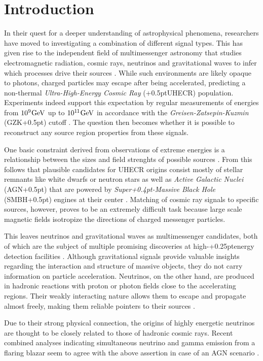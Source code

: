 \chapter{Introduction}
\label{ch:introduction}

In their quest for a deeper understanding of astrophysical phenomena, researchers have moved to investigating
a combination of different signal types. This has given rise to the independent field of multimessenger astronomy
that studies electromagnetic radiation, cosmic rays, neutrinos and gravitational waves to infer which processes
drive their sources \cite{Meszaros_2019}. While such environments are likely opaque to photons, charged
particles may escape after being accelerated, predicting a non-thermal \emph{Ultra-High-Energy Cosmic Ray}
({\kern+0.5pt}UHECR) population. Experiments indeed support this expectation by regular measurements of
energies from $10^{9}{\kern+0.5pt}\unit{\giga\electronvolt}$ up to
$10^{1{\kern-0.3pt}1}{\kern+0.5pt}\unit{\giga\electronvolt}$ in accordance
with the \emph{Greisen-Zatsepin-Kuzmin} (GZK{\kern+0.5pt}) cutoff \cite{pa}. The question then becomes
whether it is possible to reconstruct any source region properties from these signals.

One basic constraint derived from observations of extreme energies is a relationship between the sizes and field
strenghts of possible sources \cite{Hillas_1984}. From this follows that plausible candidates for UHECR origins
consist mostly of stellar remnants like white dwarfs or neutron stars as well as \emph{Active Galactic Nuclei}
(AGN{\kern+0.5pt}) that are powered by \emph{Super{\kern+0.4pt}-Massive Black Hole} (SMBH{\kern+0.5pt}) engines
at their center \cite{Tjus_2020, Gabici_2019, Drury_2012}. Matching of cosmic ray signals to specific sources,
however, proves to be an extremely difficult task because large scale magnetic fields isotropize the directions
of charged messenger particles.

This leaves neutrinos and gravitational waves as multimessenger candidates, both of which are the subject of multiple
promising discoveries at high-{\kern+0.25pt}energy detection facilities \cite{ic_first_evidence, ic_more_evidence, ligo}.
Although gravitational signals provide valuable insights regarding the interaction and structure of massive objects,
they do not carry information on particle acceleration. Neutrinos, on the other hand, are produced in hadronic
reactions with proton or photon fields close to the accelerating regions. Their weakly interacting nature allows them
to escape and propagate almost freely, making them reliable pointers to their sources \cite{Becker_2008}.

Due to their strong physical connection, the origins of highly energetic neutrinos are thought to be closely related
to those of hadronic cosmic rays. Recent combined analyses indicating simultaneous neutrino and gamma emission from a
flaring blazar seem to agree with the above assertion in case of an AGN scenario \cite{ic_blazar_flare, ic_blazar_signal}.

\cite{Murase_2009}

